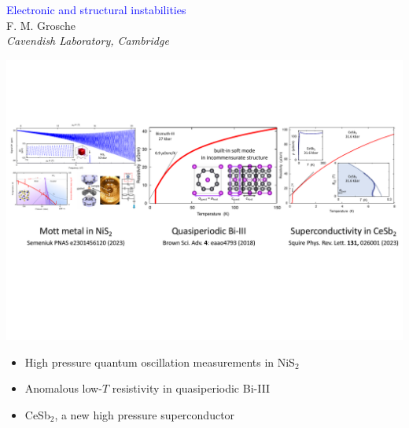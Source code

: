 \begin{emptyframe}
\begin{center}
\textcolor{Blue}{Electronic and structural instabilities} \\
\vspace{0.5em}
{\footnotesize F. M. Grosche} \\
{\footnotesize \em Cavendish Laboratory, Cambridge} \\
\vspace{0.1em}
\end{center}
\vspace{0.0em}
        \centerline{ \includegraphics[width=\columnwidth]{IntroPicture2}}

\vspace{1em}
\begin{itemize}
    \item<1-> High pressure quantum oscillation measurements in NiS$_2$
    \item<2-> Anomalous low-$T$ resistivity in quasiperiodic Bi-III
    \item<3-> CeSb$_2$, a new high pressure superconductor
\end{itemize}
\end{emptyframe}

